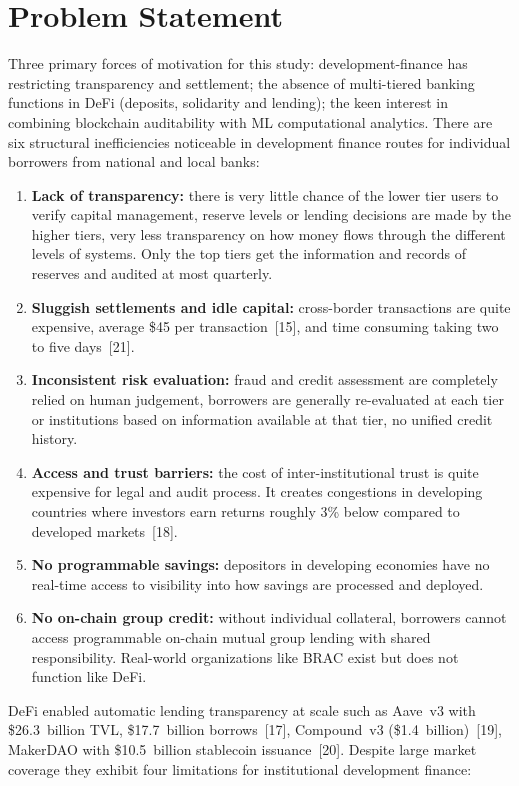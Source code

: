 \documentclass[12pt, a4paper]{report}
\begin{document}
\section{Problem Statement}

Three primary forces of motivation for this study: development-finance has restricting transparency and settlement; the absence of multi-tiered banking functions in DeFi (deposits, solidarity and lending); the keen interest in combining blockchain auditability with ML computational analytics. There are six structural inefficiencies noticeable in development finance routes for individual borrowers from national and local banks:

\begin{enumerate}[noitemsep]
\item \textbf{Lack of transparency:} there is very little chance of the lower tier users to verify capital management, reserve levels or lending decisions are made by the higher tiers, very less transparency on how money flows through the different levels of systems. Only the top tiers get the information and records of reserves and audited at most quarterly.
\item \textbf{Sluggish settlements and idle capital:} cross-border transactions are quite expensive, average \$45 per transaction~[15], and time consuming taking two to five days~[21].
\item \textbf{Inconsistent risk evaluation:} fraud and credit assessment are completely relied on human judgement, borrowers are generally re-evaluated at each tier or institutions based on information available at that tier, no unified credit history.
\item \textbf{Access and trust barriers:} the cost of inter-institutional trust is quite expensive for legal and audit process. It creates congestions in developing countries where investors earn returns roughly 3\% below compared to developed markets~[18].
\item \textbf{No programmable savings:} depositors in developing economies have no real-time access to visibility into how savings are processed and deployed.
\item \textbf{No on-chain group credit:} without individual collateral, borrowers cannot access programmable on-chain mutual group lending with shared responsibility. Real-world organizations like BRAC exist but does not function like DeFi.
\end{enumerate}

DeFi enabled automatic lending transparency at scale such as Aave~v3 with \$26.3~billion TVL, \$17.7~billion borrows~[17], Compound~v3 (\$1.4~billion)~[19], MakerDAO with \$10.5~billion stablecoin issuance~[20]. Despite large market coverage they exhibit four limitations for institutional development finance:
\end{document}
